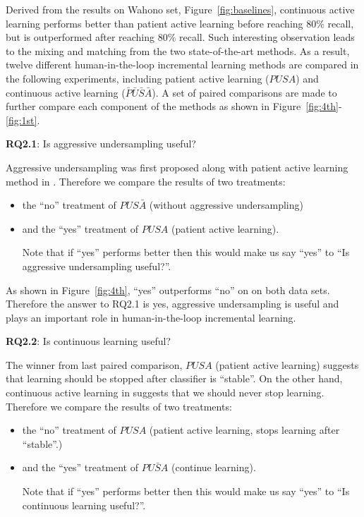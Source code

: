 \documentclass[final,twocolumn,5p]{elsarticle}
\theoremstyle{break}
\begin{document}
Derived from the results on Wahono set, Figure~\ref{fig:baselines}, continuous active learning performs better than patient active learning before reaching $80\%$ recall, but is outperformed after reaching $80\%$ recall. Such interesting observation leads to the mixing and matching from the two state-of-the-art methods. As a result, twelve different human-in-the-loop incremental learning methods are compared in the following experiments, including patient active learning ($PUSA$) and continuous active learning ($\bar{P}\bar{U}\bar{S}\bar{A}$).  A set of paired comparisons are made to further compare each component of the methods as shown in Figure~\ref{fig:4th}-\ref{fig:1st}.


\textbf{RQ2.1}: Is aggressive undersampling useful?

Aggressive undersampling was first proposed along with patient active learning method in \cite{wallace2010semi}. Therefore we compare the results of two treatments:
\begin{itemize}
\item the ``no'' treatment of $PUS\bar{A}$ (without aggressive undersampling)
\item and the ``yes'' treatment of $PUSA$ (patient active learning). 

Note that if ``yes''
performs better then this would make us say ``yes'' to ``Is aggressive undersampling useful?''.
\end{itemize}
As shown in Figure~\ref{fig:4th}, ``yes'' outperforms ``no'' on on both data sets. Therefore the answer to RQ2.1 is yes, aggressive undersampling is useful and plays an important role in human-in-the-loop incremental learning.

\textbf{RQ2.2}: Is continuous learning useful?

The winner from last paired comparison, $PUSA$ (patient active learning) suggests that learning should be stopped after classifier is ``stable''. On the other hand, continuous active learning in \cite{cormack2014evaluation} suggests that we should never stop learning. Therefore we compare the results of two treatments:

\begin{itemize}
\item the ``no'' treatment of $PUSA$ (patient active learning, stops learning after ``stable''.)
\item and the ``yes'' treatment of $PU\bar{S}A$ (continue learning). 

Note that if ``yes''
performs better then this would make us say ``yes'' to ``Is continuous learning useful?''.
\end{itemize}
\end{document}
